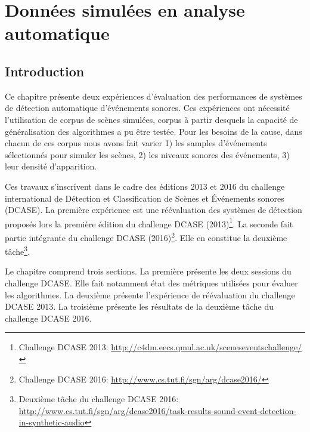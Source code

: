 \chapter[Données simulées en analyse automatique]{Données simulées en analyse automatique}\label{ch:ml_simuperf}


\section{Introduction}

Ce chapitre présente deux expériences d'évaluation des performances de systèmes de détection automatique d'événements sonores. Ces expériences ont nécessité l'utilisation de corpus de scènes simulées, corpus à partir desquels la capacité de généralisation des algorithmes a pu être testée. Pour les besoins de la cause, dans chacun de ces corpus nous avons fait varier 1) les samples d'événements sélectionnés pour simuler les scènes, 2) les niveaux sonores des événements, 3) leur densité d'apparition.

Ces travaux s'inscrivent dans le cadre des éditions 2013 et 2016 du challenge international de Détection et Classification de Scènes et Événements sonores (DCASE). La première expérience est une réévaluation des systèmes de détection proposés lors la première édition du challenge DCASE (2013)\footnote{Challenge DCASE 2013: \url{http://c4dm.eecs.qmul.ac.uk/sceneseventschallenge/}}. La seconde fait partie intégrante du challenge DCASE (2016)\footnote{Challenge DCASE 2016: \url{http://www.cs.tut.fi/sgn/arg/dcase2016/}}. Elle en constitue la deuxième tâche\footnote{Deuxième tâche du challenge DCASE 2016: \url{http://www.cs.tut.fi/sgn/arg/dcase2016/task-results-sound-event-detection-in-synthetic-audio}}.

Le chapitre comprend trois sections. La première présente les deux sessions du challenge DCASE. Elle fait notamment état des métriques utilisées pour évaluer les algorithmes. La deuxième présente l'expérience de réévaluation du challenge DCASE 2013. La troisième présente les résultats de la deuxième tâche du challenge DCASE 2016.

